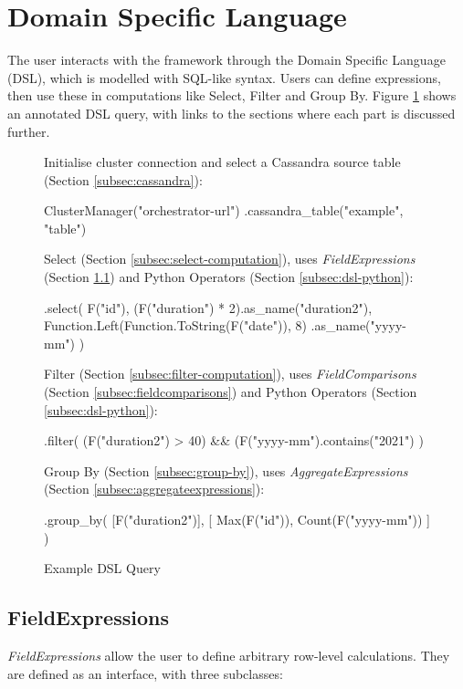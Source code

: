 \pagebreak
\section{Domain Specific Language}
The user interacts with the framework through the Domain Specific Language (DSL), which is modelled with SQL-like syntax. Users can define expressions, then use these in computations like Select, Filter and Group By. Figure \ref{fig:dsl-high-level-example} shows an annotated DSL query, with links to the sections where each part is discussed further.

\begin{figure}[htp]
	Initialise cluster connection and select a Cassandra source table (Section \ref{subsec:cassandra}):
	\begin{python}
ClusterManager("orchestrator-url")
  .cassandra_table("example", "table")
	\end{python}
	
	Select (Section \ref{subsec:select-computation}), uses \textit{FieldExpressions} (Section \ref{subsec:fieldexpressions}) and Python Operators (Section \ref{subsec:dsl-python}):
	\begin{python}
  .select(
    F("id"),
    (F("duration") * 2).as_name("duration2"),
    Function.Left(Function.ToString(F("date")), 8)
      .as_name("yyyy-mm")
  )
	\end{python}

	Filter (Section \ref{subsec:filter-computation}), uses \textit{FieldComparisons} (Section \ref{subsec:fieldcomparisons}) and Python Operators (Section \ref{subsec:dsl-python}):
	\begin{python}
  .filter(
    (F("duration2") > 40) && 
  	(F("yyyy-mm").contains("2021")
  )
	\end{python}

	Group By (Section \ref{subsec:group-by}), uses \textit{AggregateExpressions} (Section \ref{subsec:aggregateexpressions}):
	\begin{python}
  .group_by(
    [F("duration2")],
    [
      Max(F("id")),
      Count(F("yyyy-mm"))
    ]
  )
	\end{python}
	\caption{Example DSL Query}
	\label{fig:dsl-high-level-example}
\end{figure}

\pagebreak
\subsection{FieldExpressions}\label{subsec:fieldexpressions}
\textit{FieldExpressions} allow the user to define arbitrary row-level calculations. They are defined as an interface, with three subclasses:

